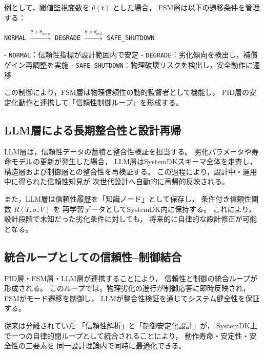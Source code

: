 例として，閾値監視変数を $\theta(t)$ とした場合，
FSM層は以下の遷移条件を管理する：

\begin{center}
\texttt{NORMAL} $\xrightarrow{\theta > \theta_{warn}}$ \texttt{DEGRADE}  
$\xrightarrow{\theta > \theta_{crit}}$ \texttt{SAFE\_SHUTDOWN}
\end{center}

- \texttt{NORMAL}：信頼性指標が設計範囲内で安定  
- \texttt{DEGRADE}：劣化傾向を検出し，補償ゲイン再調整を実施  
- \texttt{SAFE\_SHUTDOWN}：物理破壊リスクを検出し，安全動作に遷移  

この制御により，FSM層は物理信頼性の動的監督者として機能し，
PID層の安定化動作と連携して「信頼性制御ループ」を形成する。

\subsection{LLM層による長期整合性と設計再帰}
LLM層は，信頼性データの蓄積と整合性検証を担当する。
劣化パラメータや寿命モデルの更新が発生した場合，
LLM層はSystemDKスキーマ全体を走査し，
構造層および制御層との整合性を再検証する。
この過程により，設計中・運用中に得られた信頼性知見が
次世代設計へ自動的に再帰的反映される。

また，LLM層は信頼性履歴を「知識ノード」として保存し，
条件付き信頼性関数 $R(T, \sigma, V)$ を
再学習データとしてSystemDK内に保持する。
これにより，設計段階で未知だった劣化条件に対しても，
将来的に自律的な設計修正が可能となる。

\subsection{統合ループとしての信頼性–制御結合}
PID層・FSM層・LLM層が連携することにより，
信頼性と制御の統合ループが形成される。
このループでは，物理劣化の進行が制御応答に即時反映され，
FSMがモード遷移を制御し，
LLMが整合性検証を通じてシステム健全性を保証する。

従来は分離されていた
「信頼性解析」と「制御安定化設計」が，
SystemDK上で一つの自律的閉ループとして統合されることにより，
動作寿命・安定性・安全性の三要素を
同一設計理論内で同時に最適化できる。
